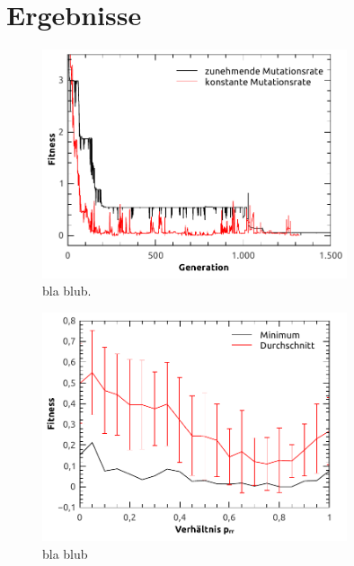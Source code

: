 \documentclass[12pt,
    a4paper,
    headinclude,
    footinclude]{scrartcl}
\begin{document}
	\section{Ergebnisse}
	
	\newcommand{\size}{0.8}
	\begin{figure}[!h]
		\begin{center}
			\includegraphics[width=\size\textwidth]{../vortrag/abbildungen/oneCycleAnalysis.pdf}
			\caption{bla blub.}
		\end{center}

	\end{figure}
	\begin{figure}[!h]
		\begin{center}
			\includegraphics[width=\size\textwidth]{../vortrag/abbildungen/n4_gemittelt_minimal_increasing.pdf}
			\caption{bla blub}
		\end{center}
	\end{figure}
	
\end{document}
